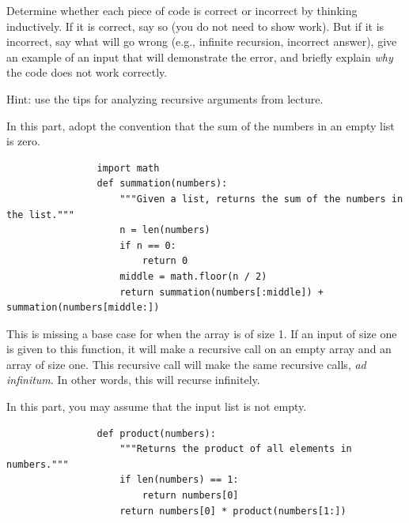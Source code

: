 \begin{prob}

    Determine whether each piece of code is correct or
    incorrect by thinking inductively. If it is correct, say so (you do not
    need to show work). But if it is incorrect, say what will go wrong (e.g.,
    infinite recursion, incorrect answer), give an example of an input that
    will demonstrate the error, and briefly explain \emph{why} the code does not
    work correctly.

    Hint: use the tips for analyzing recursive arguments from lecture.


    \begin{subprobset}
        \begin{subprob}
            In this part, adopt the convention that the sum of the numbers in an empty
            list is zero.

            \begin{verbatim}
                import math
                def summation(numbers):
                    """Given a list, returns the sum of the numbers in the list."""
                    n = len(numbers)
                    if n == 0:
                        return 0
                    middle = math.floor(n / 2)
                    return summation(numbers[:middle]) + summation(numbers[middle:])
            \end{verbatim}

            \begin{soln}
                This is missing a base case for when the array is of size 1. If
                an input of size one is given to this function, it will make a
                recursive call on an empty array and an array of size one. This
                recursive call will make the same recursive calls, \emph{ad
                infinitum}. In other words, this will recurse infinitely.
            \end{soln}
        \end{subprob}

        \begin{subprob}
            In this part, you may assume that the input list is not empty.

            \begin{verbatim}
                def product(numbers):
                    """Returns the product of all elements in numbers."""
                    if len(numbers) == 1:
                        return numbers[0]
                    return numbers[0] * product(numbers[1:])
            \end{verbatim}


\end{subprob}
\end{subprobset}
\end{prob}
